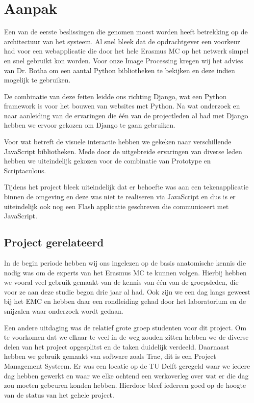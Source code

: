 \section{Aanpak}
\label{Aanpak}
Een van de eerste beslissingen die genomen moest worden heeft betrekking op de architectuur van het systeem. 
Al snel bleek dat de opdrachtgever een voorkeur had voor een webapplicatie die door het hele Erasmus MC op het netwerk simpel en snel gebruikt kon worden. 
Voor onze Image Processing kregen wij het advies van Dr. Botha om een aantal Python bibliotheken te bekijken en deze indien mogelijk te gebruiken. 

De combinatie van deze feiten leidde ons richting Django, wat een Python framework is voor het bouwen van websites met Python. 
Na wat onderzoek en naar aanleiding van de ervaringen die \'{e}\'{e}n van de projectleden al had met Django hebben we ervoor gekozen om Django te gaan gebruiken. 

Voor wat betreft de visuele interactie hebben we gekeken naar verschillende JavaScript bibliotheken. Mede door de uitgebreide ervaringen van diverse leden hebben we uiteindelijk gekozen voor de combinatie van Prototype en Scriptaculous.

Tijdens het project bleek uiteindelijk dat er behoefte was aan een tekenapplicatie binnen de omgeving en deze was niet te realiseren via JavaScript en dus is er uiteindelijk ook nog een Flash applicatie geschreven die communiceert met JavaScript.

\subsection{Project gerelateerd}
\label{aanpak_project_gerelateerd}
In de begin periode hebben wij ons ingelezen op de basis anatomische kennis die nodig was om de experts van het Erasmus MC te kunnen volgen. Hierbij hebben we vooral veel gebruik gemaakt van de kennis van \'{e}\'{e}n van de groepsleden, die voor ze aan deze studie begon drie jaar al had. Ook zijn we een dag langs geweest bij het EMC en hebben daar een rondleiding gehad door het laboratorium en de snijzalen waar onderzoek wordt gedaan. 

Een andere uitdaging was de relatief grote groep studenten voor dit project. 
Om te voorkomen dat we elkaar te veel in de weg zouden zitten hebben we de diverse delen van het project opgesplitst en de taken duidelijk verdeeld. 
Daarnaast hebben we gebruik gemaakt van software zoals Trac, dit is een Project Management Systeem. 
Er was een locatie op de TU Delft geregeld waar we iedere dag hebben gewerkt en waar we elke ochtend een werkoverleg over wat er die dag zou moeten gebeuren konden hebben. 
Hierdoor bleef iedereen goed op de hoogte van de status van het gehele project.

